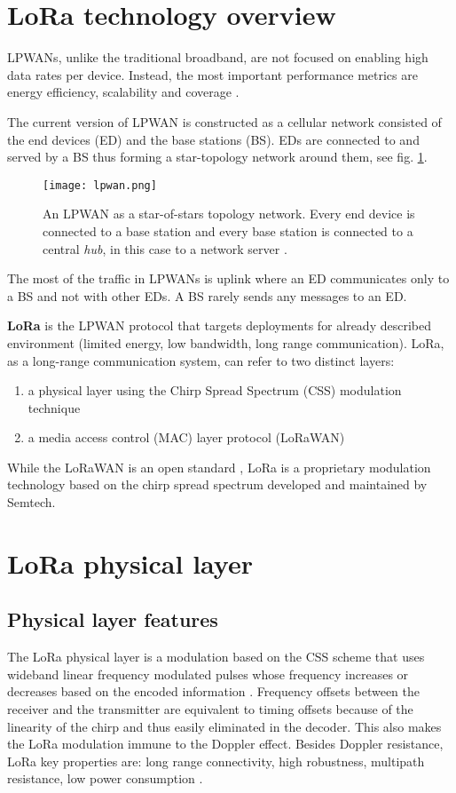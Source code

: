 \section{LoRa technology overview}
LPWANs, unlike the traditional broadband, are not focused on enabling high data rates per device. 
Instead, the most important performance metrics are energy efficiency, scalability and coverage \cite{Mikhaylov_LoRaWAN}.

The current version of LPWAN is constructed as a cellular network consisted of the end devices (ED) and the base stations (BS). 
EDs are connected to and served by a BS thus forming a star-topology network around them, see fig. \ref{fig:lpwan}.
\begin{figure}[h]
    \centering
    \texttt{[image: lpwan.png]}
    \caption{An LPWAN as a star-of-stars topology network. Every end device is connected to a base station and every base station is connected to a central \textit{hub}, in this case to a network server \cite{TTN}.}
    \label{fig:lpwan}
\end{figure}

The most of the traffic in LPWANs is uplink where an ED communicates only to a BS and not with other EDs. A BS rarely sends any messages to an ED.

\textbf{LoRa} is the LPWAN protocol that targets deployments for already described environment (limited energy, low bandwidth, long range communication).
LoRa, as a long-range communication system, can refer to two distinct layers: \cite{Aloys_LoRa}
\begin{enumerate}
    \item a physical layer using the Chirp Spread Spectrum (CSS) modulation technique
    \item a media access control (MAC) layer protocol (LoRaWAN) 
\end{enumerate}
While the LoRaWAN is an open standard \cite{lora-alliance}, LoRa is a proprietary modulation technology based on the chirp spread spectrum developed and maintained by Semtech. 

\section{LoRa physical layer}
\subsection{Physical layer features}
The LoRa physical layer is a modulation based on the CSS scheme that uses wideband linear frequency modulated pulses whose frequency increases or decreases based on the encoded information \cite{Mikhaylov_LoRaWAN}.
Frequency offsets between the receiver and the transmitter are equivalent to timing offsets because of the linearity of the chirp and thus easily eliminated in the decoder. 
This also makes the LoRa modulation immune to the Doppler effect. 
Besides Doppler resistance, LoRa key properties are: long range connectivity, high robustness, multipath resistance, low power consumption \cite{Bor_LoRA}.

